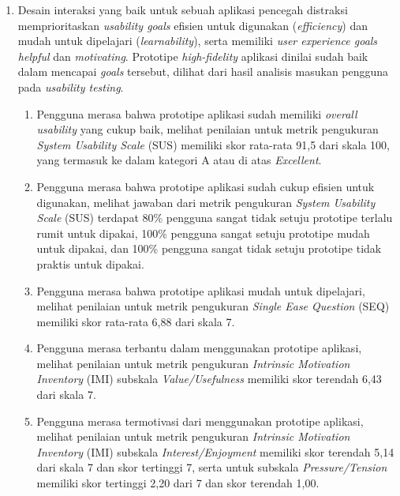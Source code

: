 \begin{enumerate}
  \item Desain interaksi yang baik untuk sebuah aplikasi pencegah distraksi memprioritaskan \textit{usability goals} efisien untuk digunakan (\textit{efficiency}) dan mudah untuk dipelajari (\textit{learnability}), serta memiliki \textit{user experience goals} \textit{helpful} dan \textit{motivating}. Prototipe \textit{high-fidelity} aplikasi dinilai sudah baik dalam mencapai \textit{goals} tersebut, dilihat dari hasil analisis masukan pengguna pada \textit{usability testing}.
    \begin{enumerate}[label=\alph*.]
      \item Pengguna merasa bahwa prototipe aplikasi sudah memiliki \textit{overall usability} yang cukup baik, melihat penilaian untuk metrik pengukuran \textit{System Usability Scale} (SUS) memiliki skor rata-rata 91,5 dari skala 100, yang termasuk ke dalam kategori A atau di atas \textit{Excellent}. 
      
      \item Pengguna merasa bahwa prototipe aplikasi sudah cukup efisien untuk digunakan, melihat jawaban dari metrik pengukuran \textit{System Usability Scale} (SUS) terdapat 80\% pengguna sangat tidak setuju prototipe terlalu rumit untuk dipakai, 100\% pengguna sangat setuju prototipe mudah untuk dipakai, dan 100\% pengguna sangat tidak setuju prototipe tidak praktis untuk dipakai. 
      
      \item Pengguna merasa bahwa prototipe aplikasi mudah untuk dipelajari, melihat penilaian untuk metrik pengukuran \textit{Single Ease Question} (SEQ) memiliki skor rata-rata 6,88 dari skala 7.
      
      \item Pengguna merasa terbantu dalam menggunakan prototipe aplikasi, melihat penilaian untuk metrik pengukuran \textit{Intrinsic Motivation Inventory} (IMI) subskala \textit{Value/Usefulness} memiliki skor terendah 6,43 dari skala 7.
      
      \item Pengguna merasa termotivasi dari menggunakan prototipe aplikasi, melihat penilaian untuk metrik pengukuran \textit{Intrinsic Motivation Inventory} (IMI) subskala \textit{Interest/Enjoyment} memiliki skor terendah 5,14 dari skala 7 dan skor tertinggi 7, serta untuk subskala \textit{Pressure/Tension} memiliki skor tertinggi 2,20 dari 7 dan skor terendah 1,00.
        
    \end{enumerate}
    

\end{enumerate}
